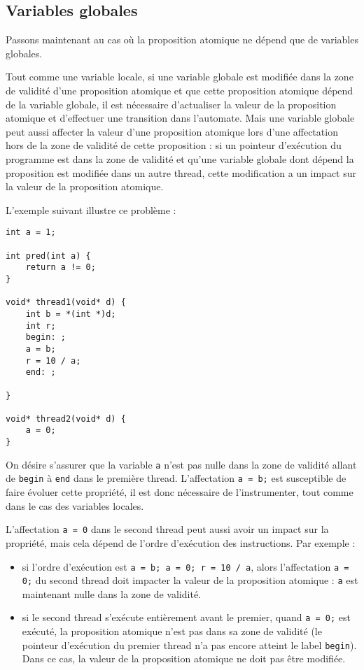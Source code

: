 \subsection{Variables globales}

Passons maintenant au cas où la proposition atomique ne dépend que de
variables globales.

Tout comme une variable locale, si une variable globale est modifiée
dans la zone de validité d'une proposition atomique et que cette
proposition atomique dépend de la variable globale, il est nécessaire
d'actualiser la valeur de la proposition atomique et d'effectuer une
transition dans l'automate. Mais une variable globale peut aussi
affecter la valeur d'une proposition atomique lors d'une affectation
hors de la zone de validité de cette proposition : si un pointeur
d'exécution du programme est dans la zone de validité et qu'une variable
globale dont dépend la proposition est modifiée dans un autre thread,
cette modification a un impact sur la valeur de la proposition atomique.

L'exemple suivant illustre ce problème :

\begin{lstlisting}
int a = 1;

int pred(int a) {
    return a != 0;
}

void* thread1(void* d) {
    int b = *(int *)d;
    int r;
    begin: ;
    a = b;
    r = 10 / a;
    end: ;

}

void* thread2(void* d) {
    a = 0;
}
\end{lstlisting}

On désire s'assurer que la variable \lstinline!a! n'est pas nulle dans
la zone de validité allant de \lstinline!begin! à \lstinline!end! dans
le première thread. L'affectation \lstinline!a = b;! est susceptible de
faire évoluer cette propriété, il est donc nécessaire de l'instrumenter,
tout comme dans le cas des variables locales.

L'affectation \lstinline!a = 0! dans le second thread peut aussi avoir
un impact sur la propriété, mais cela dépend de l'ordre d'exécution des
instructions. Par exemple :

\begin{itemize}
\item
  si l'ordre d'exécution est \lstinline!a = b; a = 0; r = 10 / a!, alors
  l'affectation \lstinline!a = 0;! du second thread doit impacter la
  valeur de la proposition atomique : \lstinline!a! est maintenant nulle
  dans la zone de validité.
\item
  si le second thread s'exécute entièrement avant le premier, quand
  \lstinline!a = 0;! est exécuté, la proposition atomique n'est pas dans
  sa zone de validité (le pointeur d'exécution du premier thread n'a pas
  encore atteint le label \lstinline!begin!). Dans ce cas, la valeur de
  la proposition atomique ne doit pas être modifiée.
\end{itemize}

